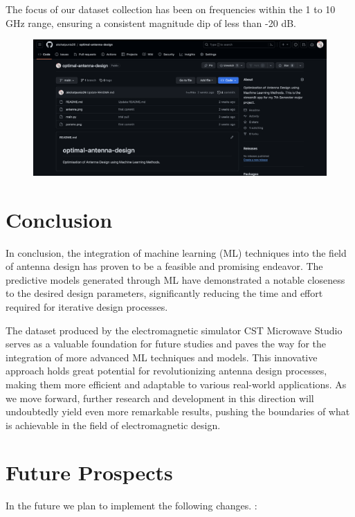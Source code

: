 \documentclass[a4paper,12pt]{report}
\begin{document}
The focus of our dataset collection has been on frequencies within the 1 to 10 GHz range, ensuring a consistent magnitude dip of less than -20 dB.

\begin{figure}[H]
    \centering
    \includegraphics[width=1\textwidth]{github.png}
    \label{fig:width_calculator}
\end{figure}



\chapter{Conclusion}
In conclusion, the integration of machine learning (ML) techniques into the field of antenna design has proven to be a feasible and promising endeavor. The predictive models generated through ML have demonstrated a notable closeness to the desired design parameters, significantly reducing the time and effort required for iterative design processes. 
\linebreak
\par The dataset produced by the electromagnetic simulator CST Microwave Studio serves as a valuable foundation for future studies and paves the way for the integration of more advanced ML techniques and models. This innovative approach holds great potential for revolutionizing antenna design processes, making them more efficient and adaptable to various real-world applications. As we move forward, further research and development in this direction will undoubtedly yield even more remarkable results, pushing the boundaries of what is achievable in the field of electromagnetic design.


\chapter{Future Prospects}

In the future we plan to implement the following changes. :
\end{document}
